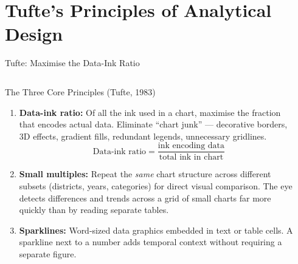 \documentclass[aspectratio=169,10pt]{beamer}
\begin{document}
\section{Tufte's Principles of Analytical Design}

\begin{frame}{Tufte: Maximise the Data-Ink Ratio}
  \begin{columns}[T]
      \begin{block}{The Three Core Principles (Tufte, 1983)}
        \begin{enumerate}
          \item \textbf{Data-ink ratio:}  Of all the ink used in a chart, maximise the fraction that encodes actual data.  Eliminate ``chart junk'' --- decorative borders, 3D effects, gradient fills, redundant legends, unnecessary gridlines.
          \vspace{4pt}
          \[\text{Data-ink ratio} = \frac{\text{ink encoding data}}{\text{total ink in chart}}\]
          \vspace{2pt}
          \item \textbf{Small multiples:}  Repeat the \textit{same} chart structure across different subsets (districts, years, categories) for direct visual comparison.  The eye detects differences and trends across a grid of small charts far more quickly than by reading separate tables.
          \item \textbf{Sparklines:}  Word-sized data graphics embedded in text or table cells.  A sparkline next to a number adds temporal context without requiring a separate figure.
        \end{enumerate}
      \end{block}

      \begin{center}
\end{center}
\end{columns}
\end{frame}
\end{document}
